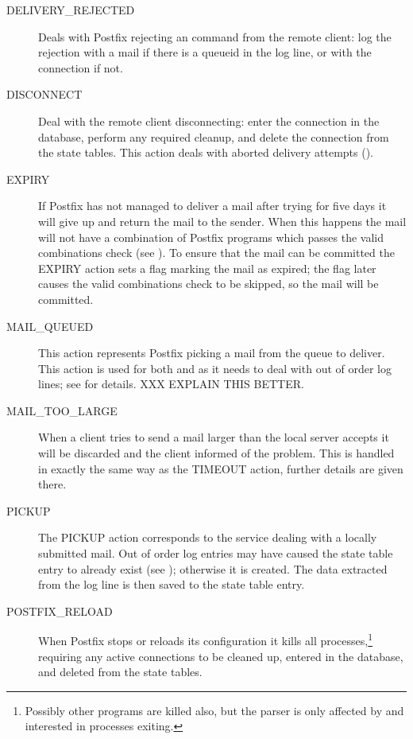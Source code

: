 \begin{description}
    \item [DELIVERY\_REJECTED] Deals with Postfix rejecting an
         command from the remote client: log the rejection
        with a mail if there is a queueid in the log line, or with the
        connection if not.

    \item [DISCONNECT] Deal with the remote client disconnecting: enter the
        connection in the database, perform any required cleanup, and
        delete the connection from the state tables.  This action deals
        with aborted delivery attempts
        ().

    \item [EXPIRY] If Postfix has not managed to deliver a mail after
        trying for five days it will give up and return the mail to the
        sender.  When this happens the mail will not have a combination of
        Postfix programs which passes the valid combinations check (see
        ).  To ensure that the mail can
        be committed the EXPIRY action sets a flag marking the mail as
        expired; the flag later causes the valid combinations check to be
        skipped, so the mail will be committed.

    \item [MAIL\_QUEUED] This action represents Postfix picking a mail from
        the queue to deliver. This action is used for both 
        and  as it needs to deal with out of order log
        lines; see  for details.
        XXX EXPLAIN THIS BETTER\@.

    \item [MAIL\_TOO\_LARGE] When a client tries to send a mail larger than
        the local server accepts it will be discarded and the client
        informed of the problem.  This is handled in exactly the same way
        as the TIMEOUT action, further details are given there.

    \item [PICKUP] The PICKUP action corresponds to the 
        service dealing with a locally submitted mail.  Out of order log
        entries may have caused the state table entry to already exist (see
        ); otherwise it is
        created.  The data extracted from the log line is then saved to the
        state table entry.

    \item [POSTFIX\_RELOAD] When Postfix stops or reloads its configuration
        it kills all  processes,\footnote{Possibly other
        programs are killed also, but the parser is only affected by and
        interested in  processes exiting.} requiring any
        active connections to be cleaned up, entered in the database, and
        deleted from the state tables.


\end{description}
